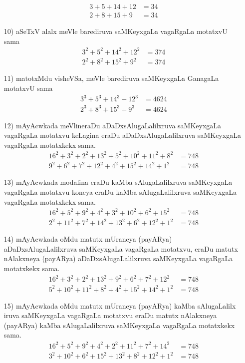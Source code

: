 \begin{enumerate}
\begin{align*}
3+5+14+12 &=34\\
2+8+15+9  &=34
\end{align*}

\item[{\rm 10)}] aSeTxV alalx meVle barediruva saMKeyxgaLa vagaRgaLa motatxvU sama
\begin{align*}
3^2+5^2+14^2+12^2 &=374\\
2^2+8^2+15^2+9^2 &=374
\end{align*}

\item[{\rm 11)}] matotxMdu visheVSa, meVle barediruva saMKeyxgaLa GanagaLa motatxvU sama
\begin{align*}
3^3+5^3+14^3+12^3 &=4624\\
2^3+8^3+15^3+9^3 &=4624
\end{align*}

\item[{\rm 12)}] mAyAcwkada meVlineraDu aDaDxsAlugaLalilxruva saMKeyxgaLa vagaRgaLa motatxvu keLagina eraDu aDaDxsAlugaLalilxruva saMKeyxgaLa vagaRgaLa motatxkekx sama.
\begin{align*}
16^2+3^2+2^2+13^2+5^2+10^2+11^2+8^2 &=748\\
9^2+6^2+7^2+12^2+4^2+15^2+14^2+1^2 &=748
\end{align*}

\item[{\rm 13)}] mAyAcwkada modalina eraDu kaMba sAlugaLalilxruva saMKeyxgaLa vagaRgaLa motatxvu koneya eraDu kaMba sAlugaLalilxruva saMKeyxgaLa vagaRgaLa motatxkekx sama.
\begin{align*}
16^2+5^2+9^2+4^2+3^2+10^2+6^2+15^2 &=748\\
2^2+11^2+7^2+14^2+13^2+6^2+12^2+1^2 &=748
\end{align*}

\item[{\rm 14)}] mAyAcwkada oMdu matutx mUraneya (payARya) aDaDxsAlugaLalilxruva saMKeyxgaLa vagaRgaLa motatxvu, eraDu matutx nAlakxneya (payARya) aDaDxsAlugaLalilxruva saMKeyxgaLa vagaRgaLa motatxkekx sama.
\begin{align*}
16^2+3^2+2^2+13^2+9^2+6^2+7^2+12^2 &=748\\
5^2+10^2+11^2+8^2+4^2+15^2+14^2+1^2 &=748
\end{align*}

\item[{\rm 15)}] mAyAcwkada oMdu matutx mUraneya (payARya) kaMba sAlugaLalilx iruva saMKeyxgaLa vagaRgaLa motatxvu eraDu matutx nAlakxneya (payARya) kaMba sAlugaLalilxruva saMKeyxgaLa vagaRgaLa motatxkekx sama.
\begin{align*}
16^2+5^2+9^2+4^2+2^2+11^2+7^2+14^2 &=748\\
3^2+10^2+6^2+15^2+13^2+8^2+12^2+1^2 &=748
\end{align*}


\end{enumerate}
